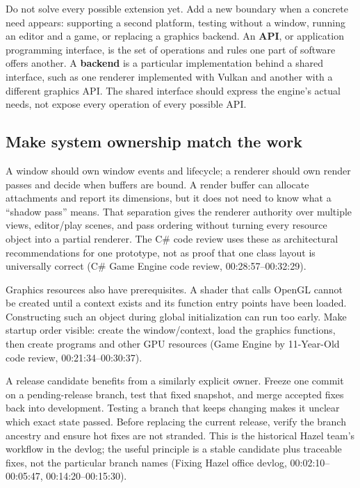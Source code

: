Do not solve every possible extension yet. Add a new boundary when a concrete need appears: supporting a second platform, testing without a window, running an editor and a game, or replacing a graphics backend. An \textbf{API}, or application programming interface, is the set of operations and rules one part of software offers another. A \textbf{backend} is a particular implementation behind a shared interface, such as one renderer implemented with Vulkan and another with a different graphics API. The shared interface should express the engine's actual needs, not expose every operation of every possible API.

\subsection{Make system ownership match the work}\label{05-engine-i-ch008-make-system-ownership-match-the-work}

\hypertarget{05-engine-i-ch008-make-system-ownership-match-the-work}{}

A window should own window events and lifecycle; a renderer should own render passes and decide when buffers are bound. A render buffer can allocate attachments and report its dimensions, but it does not need to know what a ``shadow pass'' means. That separation gives the renderer authority over multiple views, editor/play scenes, and pass ordering without turning every resource object into a partial renderer. The C\# code review uses these as architectural recommendations for one prototype, not as proof that one class layout is universally correct (C\# Game Engine code review, 00:28:57--00:32:29).

Graphics resources also have prerequisites. A shader that calls OpenGL cannot be created until a context exists and its function entry points have been loaded. Constructing such an object during global initialization can run too early. Make startup order visible: create the window/context, load the graphics functions, then create programs and other GPU resources (Game Engine by 11-Year-Old code review, 00:21:34--00:30:37).

A release candidate benefits from a similarly explicit owner. Freeze one commit on a pending-release branch, test that fixed snapshot, and merge accepted fixes back into development. Testing a branch that keeps changing makes it unclear which exact state passed. Before replacing the current release, verify the branch ancestry and ensure hot fixes are not stranded. This is the historical Hazel team's workflow in the devlog; the useful principle is a stable candidate plus traceable fixes, not the particular branch names (Fixing Hazel office devlog, 00:02:10--00:05:47, 00:14:20--00:15:30).

